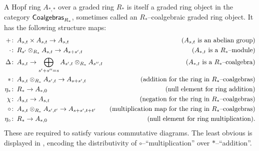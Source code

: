 \begin{definition}
A Hopf ring $A_{*, *}$ over a graded ring $R_*$ is itself a graded ring object in the category $\mathsf{Coalgebras}_{R_*}$, sometimes called an $R_*$--coalgebraic graded ring object.  It has the following structure maps:
\begin{align*}
+ & \colon\thinspace A_{s, t} \times A_{s, t} \to A_{s, t} & \text{($A_{s, t}$ is an abelian group)} \\
\cdot & \colon\thinspace R_{s'} \otimes_{R_*} A_{s, t} \to A_{s+s', t} & \text{($A_{*, t}$ is a $R_*$--module)} \\
\Delta & \colon\thinspace A_{s, t} \to \bigoplus_{s' + s'' = s} A_{s', t} \otimes_{R_*} A_{s'', t} & \text{($A_{*, t}$ is a $R_*$--coalgebra)} \\
\ast & \colon\thinspace A_{s, t} \otimes_{R_*} A_{s', t} \to A_{s + s', t} & \text{(addition for the ring in $R_*$--coalgebras)} \\
\eta_\ast & \colon\thinspace R_* \to A_{*, 0} & \text{(null element for ring addition)} \\
\chi & \colon\thinspace A_{s, t} \to A_{s, t} & \text{(negation for the ring in $R_*$--coalgebras)} \\
\circ & \colon\thinspace A_{s, t} \otimes_{R_*} A_{s', t'} \to A_{s + s', t + t'} & \text{(multiplication map for the ring in $R_*$--coalgebras)} \\
\eta_\circ & \colon\thinspace R_* \to A_{*, 0} & \text{(null element for ring multiplication)}.
\end{align*}
These are required to satisfy various commutative diagrams. The least obvious is displayed in , encoding the distributivity of $\circ$--``multiplication'' over $\ast$--``addition''.
\end{definition}

